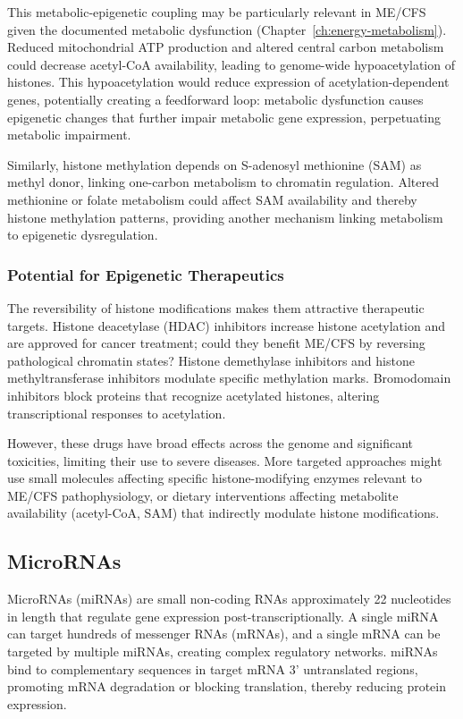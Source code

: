 This metabolic-epigenetic coupling may be particularly relevant in ME/CFS given the documented metabolic dysfunction (Chapter~\ref{ch:energy-metabolism}). Reduced mitochondrial ATP production and altered central carbon metabolism could decrease acetyl-CoA availability, leading to genome-wide hypoacetylation of histones. This hypoacetylation would reduce expression of acetylation-dependent genes, potentially creating a feedforward loop: metabolic dysfunction causes epigenetic changes that further impair metabolic gene expression, perpetuating metabolic impairment.

Similarly, histone methylation depends on S-adenosyl methionine (SAM) as methyl donor, linking one-carbon metabolism to chromatin regulation. Altered methionine or folate metabolism could affect SAM availability and thereby histone methylation patterns, providing another mechanism linking metabolism to epigenetic dysregulation.

\subsubsection{Potential for Epigenetic Therapeutics}

The reversibility of histone modifications makes them attractive therapeutic targets. Histone deacetylase (HDAC) inhibitors increase histone acetylation and are approved for cancer treatment; could they benefit ME/CFS by reversing pathological chromatin states? Histone demethylase inhibitors and histone methyltransferase inhibitors modulate specific methylation marks. Bromodomain inhibitors block proteins that recognize acetylated histones, altering transcriptional responses to acetylation.

However, these drugs have broad effects across the genome and significant toxicities, limiting their use to severe diseases. More targeted approaches might use small molecules affecting specific histone-modifying enzymes relevant to ME/CFS pathophysiology, or dietary interventions affecting metabolite availability (acetyl-CoA, SAM) that indirectly modulate histone modifications.

\subsection{MicroRNAs}
\label{sec:micrornas}

MicroRNAs (miRNAs) are small non-coding RNAs approximately 22 nucleotides in length that regulate gene expression post-transcriptionally. A single miRNA can target hundreds of messenger RNAs (mRNAs), and a single mRNA can be targeted by multiple miRNAs, creating complex regulatory networks. miRNAs bind to complementary sequences in target mRNA 3' untranslated regions, promoting mRNA degradation or blocking translation, thereby reducing protein expression.

